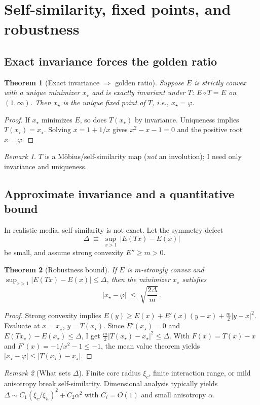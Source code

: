 \documentclass[11pt]{article}
\newtheorem{theorem}{Theorem}
\theoremstyle{remark}
\newtheorem{remark}{Remark}
\theoremstyle{definition}
\newcommand{\ph}{\varphi}
\begin{document}
\section{Self-similarity, fixed points, and robustness}
\subsection{Exact invariance forces the golden ratio}
\begin{theorem}[Exact invariance $\Rightarrow$ golden ratio]
Suppose $E$ is strictly convex with a unique minimizer $x_\star$ and is exactly invariant under $T$: $E\circ T=E$ on $(1,\infty)$. Then $x_\star$ is the unique fixed point of $T$, i.e., $x_\star=\ph$.
\end{theorem}
\begin{proof}
If $x_\star$ minimizes $E$, so does $T(x_\star)$ by invariance. Uniqueness implies $T(x_\star)=x_\star$. Solving $x=1+1/x$ gives $x^2-x-1=0$ and the positive root $x=\ph$.
\end{proof}
\begin{remark}
$T$ is a M\"obius/self-similarity map (\emph{not} an involution); I need only invariance and uniqueness.
\end{remark}

\subsection{Approximate invariance and a quantitative bound}
In realistic media, self-similarity is not exact. Let the symmetry defect
\begin{equation}
 \Delta\;\equiv\;\sup_{x>1}\,\bigl|E(Tx)-E(x)\bigr|
\end{equation}
be small, and assume strong convexity $E''\ge m>0$.
\begin{theorem}[Robustness bound]
\label{thm:robust}
If $E$ is $m$-strongly convex and $\sup_{x>1}|E(Tx)-E(x)|\le \Delta$, then the minimizer $x_\star$ satisfies
\begin{equation}
 \bigl|x_\star-\ph\bigr|\;\le\;\sqrt{\frac{2\Delta}{m}}\,.
\end{equation}
\end{theorem}
\begin{proof}
Strong convexity implies $E(y)\ge E(x)+E'(x)(y-x)+\tfrac{m}{2}|y-x|^2$. Evaluate at $x=x_\star$, $y=T(x_\star)$. Since $E'(x_\star)=0$ and $E(Tx_\star)-E(x_\star)\le \Delta$, I get $\tfrac{m}{2}|T(x_\star)-x_\star|^2\le \Delta$. With $F(x)=T(x)-x$ and $F'(x)=-1/x^2-1\le-1$, the mean value theorem yields $|x_\star-\ph|\le |T(x_\star)-x_\star|$.
\end{proof}
\begin{remark}[What sets $\Delta$]
Finite core radius $\xi_c$, finite interaction range, or mild anisotropy break self-similarity. Dimensional analysis typically yields $\Delta\sim C_1(\xi_c/\xi_h)^2 + C_2\alpha^2$ with $C_i=O(1)$ and small anisotropy $\alpha$.
\end{remark}
\end{document}
